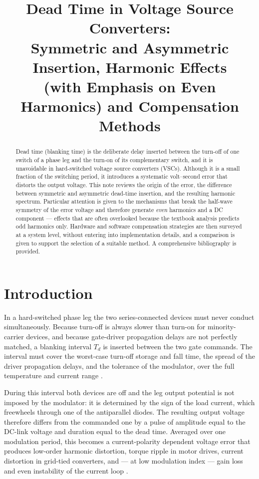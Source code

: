 \documentclass[11pt,a4paper]{article}
\title{Dead Time in Voltage Source Converters:\\
Symmetric and Asymmetric Insertion, Harmonic Effects\\
(with Emphasis on Even Harmonics) and Compensation Methods}
\author{}
\date{}
\begin{document}
\maketitle

\begin{abstract}
Dead time (blanking time) is the deliberate delay inserted between the turn-off of one
switch of a phase leg and the turn-on of its complementary switch, and it is unavoidable
in hard-switched voltage source converters (VSCs). Although it is a small fraction of the
switching period, it introduces a systematic volt--second error that distorts the output
voltage. This note reviews the origin of the error, the difference between symmetric and
asymmetric dead-time insertion, and the resulting harmonic spectrum. Particular attention
is given to the mechanisms that break the half-wave symmetry of the error voltage and
therefore generate \emph{even} harmonics and a DC component --- effects that are often
overlooked because the textbook analysis predicts odd harmonics only. Hardware and
software compensation strategies are then surveyed at a system level, without entering
into implementation details, and a comparison is given to support the selection of a
suitable method. A comprehensive bibliography is provided.
\end{abstract}

\tableofcontents

\section{Introduction}

In a hard-switched phase leg the two series-connected devices must never conduct
simultaneously. Because turn-off is always slower than turn-on for minority-carrier
devices, and because gate-driver propagation delays are not perfectly matched, a blanking
interval $T_d$ is inserted between the two gate commands. The interval must cover the
worst-case turn-off storage and fall time, the spread of the driver propagation delays,
and the tolerance of the modulator, over the full temperature and current range
\cite{holmes2003,mohan2003,wintrich2015}.

During this interval both devices are off and the leg output potential is not imposed by
the modulator: it is determined by the sign of the load current, which freewheels through
one of the antiparallel diodes. The resulting output voltage therefore differs from the
commanded one by a pulse of amplitude equal to the DC-link voltage and duration equal to
the dead time. Averaged over one modulation period, this becomes a current-polarity
dependent voltage error that produces low-order harmonic distortion, torque ripple in
motor drives, current distortion in grid-tied converters, and --- at low modulation index
--- gain loss and even instability of the current loop
\cite{murai1987,jeong1991,dodson1990,guha2018}.
\end{document}
